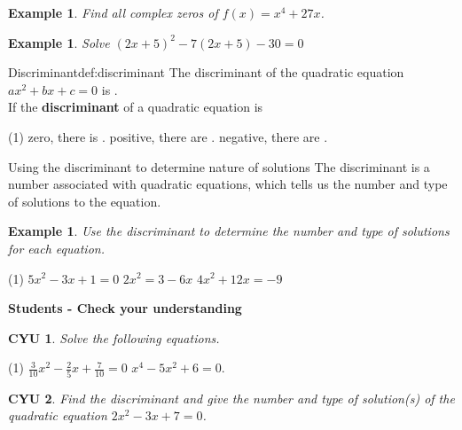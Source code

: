 \documentclass[a4paper, 12pt]{amsbook}
\newcounter{examplecounter}
\newtheorem{example}[examplecounter]{Example}
\newtheorem{checkyourunderstanding}{CYU}%
\begin{document}


\begin{example}
	Find all complex zeros of $f(x) = x^4+27x$.
\end{example}
\vskip 1.5in
\vfill

\begin{example}
	Solve $(2x+5)^{2} - 7(2x+5) - 30 = 0$
\end{example}
\vskip 1.5in
\vfill

\newpage

\begin{ColoredDefinition}{Discriminant}{def:discriminant}
	The discriminant of the quadratic equation $ax^2+bx+c=0$ is \hrulefill{}.\\ If the {\bf discriminant} of a quadratic equation is


\begin{tasks}(1)
	\task \quad zero, there is \hrulefill{}.
	\task \quad positive, there are \hrulefill{}.
	\task \quad negative, there are \hrulefill{}.
\end{tasks}
\end{ColoredDefinition}

\begin{objectivebox}{Using the discriminant to determine nature of solutions}{}
	The discriminant is a number associated with quadratic equations, which tells us the number and type of solutions to the equation.
\end{objectivebox}

\begin{example}
	Use the discriminant to determine the number and type of solutions for each equation.
\end{example}


\begin{tasks}(1)
	\task \quad $5x^{2}-3x+1=0$
	\task \quad $2x^{2}=3-6x$
	\task \quad $4x^{2}+12x=-9$
\end{tasks}

\vfill
\newpage

\textbf{Students - Check your understanding}

\begin{checkyourunderstanding}
	Solve the following equations.
\end{checkyourunderstanding}


\begin{tasks}(1)
	\task \quad $\frac{3}{10}x^{2}-\frac{2}{5}x+\frac{7}{10}=0$
	\task \quad $x^4 - 5x^2 + 6 = 0$.
\end{tasks}
\vskip 3in

\begin{checkyourunderstanding}
	Find the discriminant and give the number and type of solution(s) of the quadratic equation $2x^2-3x+7=0$.
\end{checkyourunderstanding}
\end{document}
